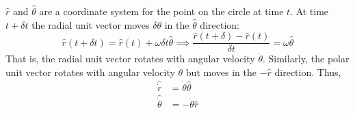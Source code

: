 \documentclass{article}
\begin{document}
$\hat r$ and $\hat \theta$ are a coordinate system for the point on the circle at time $t$. At time $t+\delta t$ the radial unit vector moves $ \delta \theta$ in the $\hat \theta$ direction:
$$
\hat r(t+\delta t)=\hat r(t)+\omega \delta t\hat \theta\implies \frac{\hat r(t+\delta)-\hat r(t)}{\delta t}=\omega \hat \theta
$$
That is, the radial unit vector rotates with angular velocity $\dot \theta$. Similarly, the polar unit vector rotates with angular velocity $\dot \theta$ but moves in the $-\hat r$ direction. Thus,
$$
\begin{aligned}
\hat {\dot r} &= \dot\theta \hat \theta\\ 
\hat{\dot \theta} &= -\dot \theta \hat r
\end{aligned}
$$
\end{document}
